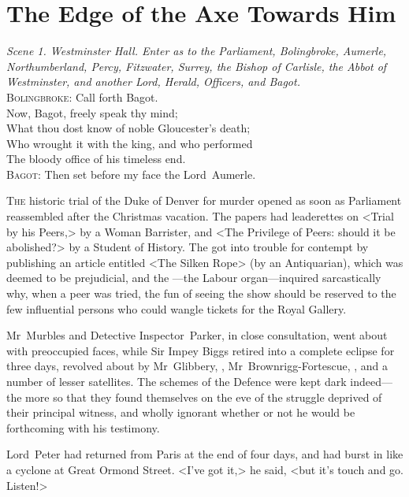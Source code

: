 

\chapter{The Edge of the Axe Towards Him}

\epigraph{
\textit{Scene 1. Westminster Hall. Enter as to the Parliament, Bolingbroke, Aumerle, Northumberland, Percy, Fitzwater, Surrey, the Bishop of Carlisle, the Abbot of Westminster, and another Lord, Herald, Officers, and Bagot.}\\
\textsc{Bolingbroke}: Call forth Bagot.\\
\indent Now, Bagot, freely speak thy mind;\\
\indent What thou dost know of noble Gloucester's death;\\
\indent Who wrought it with the king, and who performed\\
The bloody office of his timeless end.\\
\textsc{Bagot}: Then set before my face the Lord~Aumerle.}{}


\lettrine{T}{he} historic trial of the Duke of Denver for murder opened as soon as Parliament reassembled after the Christmas vacation. The papers had leaderettes on <Trial by his Peers,> by a Woman Barrister, and <The Privilege of Peers: should it be abolished?> by a Student of History.  The  got into trouble for contempt by publishing an article entitled <The Silken Rope> (by an Antiquarian), which was deemed to be prejudicial, and the —the Labour organ—inquired sarcastically why, when a peer was tried, the fun of seeing the show should be reserved to the few influential persons who could wangle tickets for the Royal Gallery.

Mr~Murbles and Detective Inspector~Parker, in close consultation, went about with preoccupied faces, while Sir Impey Biggs retired into a complete eclipse for three days, revolved about by Mr~Glibbery, , Mr~Brownrigg-Fortescue, , and a number of lesser satellites. The schemes of the Defence were kept dark indeed—the more so that they found themselves on the eve of the struggle deprived of their principal witness, and wholly ignorant whether or not he would be forthcoming with his testimony.

Lord~Peter had returned from Paris at the end of four days, and had burst in like a cyclone at Great Ormond Street. <I've got it,> he said, <but it's touch and go. Listen!>

